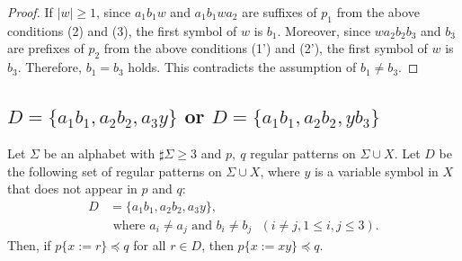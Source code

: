 \begin{proof}
If $|w| \ge 1$, since $a_{1}b_{1}w$ and $a_{1}b_{1}wa_{2}$ are suffixes of $p_{1}$ from the above conditions (2) and (3), the first symbol of $w$ is $b_{1}$.
Moreover, since $wa_{2}b_{2}b_{3}$ and $b_{3}$ are prefixes of $p_{2}$ from the above conditions (1') and (2'),
the first symbol of $w$ is $b_{3}$.
Therefore, $b_{1}=b_{3}$ holds.
This contradicts the assumption of $b_{1} \ne b_{3}$.
\end{proof}

\subsection{$D = \{ a_{1}b_{1}, a_{2}b_{2}, a_{3}y\}$ or $D = \{ a_{1}b_{1}, a_{2}b_{2}, yb_{3}\}$}\label{subsec:d3c}


\begin{lem}\label{lem:3consts_ii}
  Let $\Sigma$ be an alphabet with $\sharp\Sigma \ge 3$ and $p,~q$ regular patterns on $\Sigma\cup X$.
  Let $D$ be the following set of regular patterns on $\Sigma\cup X$, where $y$ is a variable symbol in $X$ that does not appear in $p$ and $q$:
  \begin{align*}
  D & = \{ a_{1}b_{1}, a_{2}b_{2}, a_{3}y\},\\
  & \mbox{ where } a_{i} \ne a_{j} \mbox{ and } b_{i} \ne b_{j} \mbox{ } (i\ne j, 1\le i,j\le 3).
  \end{align*}
  Then, if $p \{ x := r \} \preceq q$ for all $r \in D$, then $p \{ x := xy \} \preceq q$.
\end{lem}

